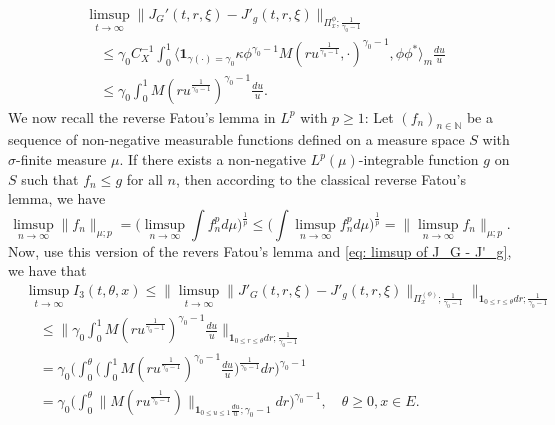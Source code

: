 \documentclass[12pt, a4paper]{amsart}
\theoremstyle{definition}
\numberwithin{equation}{section}
\begin{document}
\[\label{eq: limsup of J_G - J'_g}\begin{split}
	&\limsup_{t\to \infty} \| J_G'(t,r,\xi) - J'_g(t,r,\xi) \|_{\Pi_x^{\phi};\frac{1}{\gamma_0 - 1}}
	\\&\quad\leq  \gamma_0 C_X^{-1} \int_0^1 \big\langle \mathbf 1_{\gamma(\cdot) = \gamma_0} \kappa \phi^{\gamma_0 - 1} M(ru^{\frac{1}{\gamma_0 - 1}},\cdot)^{\gamma_0 - 1}, \phi\phi^* \big\rangle_m \frac{du}{u}
	\\&\quad\leq  \gamma_0  \int_0^1  M(ru^{\frac{1}{\gamma_0 - 1}})^{\gamma_0 - 1} \frac{du}{u}.
\end{split}\]
	We now recall the reverse Fatou's lemma in $L^p$ with $p\geq 1$: Let $(f_n)_{n\in \mathbb N}$ be a sequence of non-negative measurable functions defined on a measure space $S$ with $\sigma$-finite measure $\mu$. If there exists a non-negative $L^p(\mu)$-integrable function $g$ on $S$ such that $f_n \leq g$ for all $n$, then according to the classical reverse Fatou's lemma, we have
\[
	\limsup_{n\to \infty}\big\| f_n \big\|_{\mu;p}
	= \Big (   \limsup_{n\to \infty}  \int f^p_n d\mu        \Big)^{\frac{1}{p}}
	\leq  \Big (   \int \limsup_{n\to \infty} f^p_n d\mu        \Big)^{\frac{1}{p}}
	= \big\| \limsup_{n\to \infty} f_n \big\|_{\mu;p}.
\]
	Now, use this version of the revers Fatou's lemma and \eqref{eq: limsup of J_G - J'_g}, we have that
\[\begin{split}
	&\limsup_{t\to \infty} I_3(t,\theta, x)
	\leq \big\| \limsup_{t\to \infty} \|    J'_G(t,r,\xi) - J'_g(t,r,\xi) \|_{\Pi_x^{(\phi)};\frac{1}{\gamma_0 - 1}} \big\|_{\mathbf 1_{0\leq r\leq \theta} dr;\frac{1}{\gamma_0 - 1}}
	\\&\quad\leq \Big\| \gamma_0  \int_0^1  M(ru^{\frac{1}{\gamma_0 - 1}})^{\gamma_0 - 1} \frac{du}{u} \Big\|_{\mathbf 1_{0\leq r\leq \theta} dr;\frac{1}{\gamma_0 - 1}}
	\\&\quad = \gamma_0 \bigg( \int_0^\theta \Big (   \int_0^1  M(ru^{\frac{1}{\gamma_0 - 1}})^{\gamma_0 - 1} \frac{du}{u}   \Big )^{\frac{1}{\gamma_0 - 1}} dr \bigg)^{\gamma_0 - 1}
	\\&\quad = \gamma_0 \Big(  \int_0^\theta  \| M(r u^{\frac{1}{\gamma_0 - 1}}) \|_{\mathbf 1_{0\leq u\leq 1}\frac{du}{u};\gamma_0 - 1}  dr\Big)^{\gamma_0 - 1},
	\quad \theta \geq 0, x\in E.
\end{split}\]
	
\end{document}

